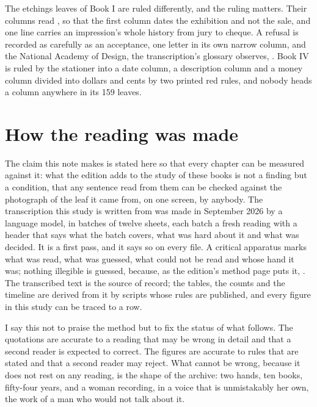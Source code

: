 The etchings leaves of Book I are ruled differently, and the ruling matters. Their columns read , so that the first column dates the exhibition and not the sale, and one line carries an impression's whole history from jury to cheque. A refusal is recorded as carefully as an acceptance, one letter in its own narrow column, and the National Academy of Design, the transcription's glossary observes, . Book IV is ruled by the stationer into a date column, a description column and a money column divided into dollars and cents by two printed red rules, and nobody heads a column anywhere in its 159 leaves.

\section{How the reading was made}

The claim this note makes is stated here so that every chapter can be measured against it: what the edition adds to the study of these books is not a finding but a condition, that any sentence read from them can be checked against the photograph of the leaf it came from, on one screen, by anybody. The transcription this study is written from was made in September 2026 by a language model, in batches of twelve sheets, each batch a fresh reading with a header that says what the batch covers, what was hard about it and what was decided. It is a first pass, and it says so on every file. A critical apparatus marks what was read, what was guessed, what could not be read and whose hand it was; nothing illegible is guessed, because, as the edition's method page puts it, . The transcribed text is the source of record; the tables, the counts and the timeline are derived from it by scripts whose rules are published, and every figure in this study can be traced to a row.

I say this not to praise the method but to fix the status of what follows. The quotations are accurate to a reading that may be wrong in detail and that a second reader is expected to correct. The figures are accurate to rules that are stated and that a second reader may reject. What cannot be wrong, because it does not rest on any reading, is the shape of the archive: two hands, ten books, fifty-four years, and a woman recording, in a voice that is unmistakably her own, the work of a man who would not talk about it.
